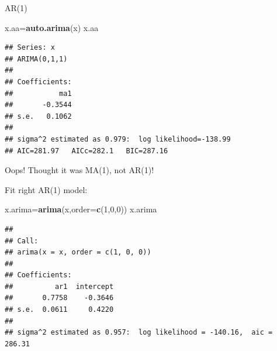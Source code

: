 \documentclass[ignorenonframetext,]{beamer}
\newenvironment{Shaded}{\begin{snugshade}}{\end{snugshade}}
\newcommand{\DataTypeTok}[1]{\textcolor[rgb]{0.13,0.29,0.53}{#1}}
\newcommand{\DecValTok}[1]{\textcolor[rgb]{0.00,0.00,0.81}{#1}}
\newcommand{\KeywordTok}[1]{\textcolor[rgb]{0.13,0.29,0.53}{\textbf{#1}}}
\newcommand{\NormalTok}[1]{#1}
\begin{document}
\begin{frame}[fragile]{AR(1)}
\protect\hypertarget{ar1}{}

\begin{Shaded}
\begin{Highlighting}[]
\NormalTok{x.aa=}\KeywordTok{auto.arima}\NormalTok{(x)}
\NormalTok{x.aa}
\end{Highlighting}
\end{Shaded}

\begin{verbatim}
## Series: x 
## ARIMA(0,1,1) 
## 
## Coefficients:
##           ma1
##       -0.3544
## s.e.   0.1062
## 
## sigma^2 estimated as 0.979:  log likelihood=-138.99
## AIC=281.97   AICc=282.1   BIC=287.16
\end{verbatim}

Oops! Thought it was MA(1), not AR(1)!

\end{frame}

\begin{frame}[fragile]{Fit right AR(1) model:}
\protect\hypertarget{fit-right-ar1-model}{}

\begin{Shaded}
\begin{Highlighting}[]
\NormalTok{x.arima=}\KeywordTok{arima}\NormalTok{(x,}\DataTypeTok{order=}\KeywordTok{c}\NormalTok{(}\DecValTok{1}\NormalTok{,}\DecValTok{0}\NormalTok{,}\DecValTok{0}\NormalTok{))}
\NormalTok{x.arima}
\end{Highlighting}
\end{Shaded}

\begin{verbatim}
## 
## Call:
## arima(x = x, order = c(1, 0, 0))
## 
## Coefficients:
##          ar1  intercept
##       0.7758    -0.3646
## s.e.  0.0611     0.4220
## 
## sigma^2 estimated as 0.957:  log likelihood = -140.16,  aic = 286.31
\end{verbatim}

\end{frame}
\end{document}

